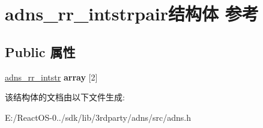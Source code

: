 \hypertarget{structadns__rr__intstrpair}{}\section{adns\+\_\+rr\+\_\+intstrpair结构体 参考}
\label{structadns__rr__intstrpair}
\subsection*{Public 属性}
\begin{DoxyCompactItemize}
\item 
\mbox{\label{structadns__rr__intstrpair_a10f4c159c3e5c8c331e3ce7a7d537421}} 
\hyperlink{structadns__rr__intstr}{adns\+\_\+rr\+\_\+intstr} {\bfseries array} \mbox{[}2\mbox{]}
\end{DoxyCompactItemize}


该结构体的文档由以下文件生成\+:\begin{DoxyCompactItemize}
\item 
E\+:/\+React\+O\+S-\/0../sdk/lib/3rdparty/adns/src/adns.\+h\end{DoxyCompactItemize}
